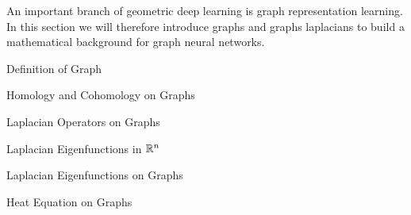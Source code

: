\documentclass[../main.tex]{subfiles}
\begin{document}
    An important branch of geometric deep learning is graph representation learning. In this section we will therefore
    introduce graphs and graphs laplacians to build a mathematical background for graph neural networks. 
    \begin{section}{Definition of Graph}
           
    \end{section}
    \begin{section}{Homology and Cohomology on Graphs}
        
    \end{section}
    \begin{section}{Laplacian Operators on Graphs}
        
    \end{section}
    \begin{section}{Laplacian Eigenfunctions in $\mathbb{R}^n$}
        
    \end{section}
    \begin{section}{Laplacian Eigenfunctions on Graphs}
        
    \end{section}
    \begin{section}{Heat Equation on Graphs}
        
    \end{section}
\end{document}
